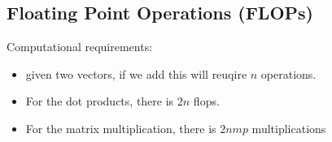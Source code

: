 \documentclass[11pt]{article}
\begin{document}
\begin{figure}[H]
    \centering
\end{figure}

\subsection{Floating Point Operations (FLOPs)}

\begin{minipage}[l]{.5\linewidth}
    \begin{figure}[H]
        \centering
    \end{figure}    
\end{minipage}\hfill
\begin{minipage}[r]{.48\linewidth}
    Computational requirements:
    \begin{itemize}
        \item given two vectors, if we add this will reuqire $n$ operations.
        \item For the dot products, there is $2n$ flops.
        \item For the matrix multiplication, there is $2nmp$ multiplications
    \end{itemize}
\end{minipage}
\end{document}
